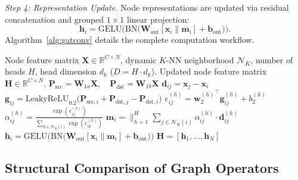\documentclass[]{interact}
\theoremstyle{plain}
\theoremstyle{definition}
\theoremstyle{remark}
\begin{document}
{\textit{Step 4: Representation Update.} Node representations are updated via residual concatenation and grouped $1 \times 1$ linear projection:
\begin{equation}
\mathbf{h}_i = \text{GELU}\!\Big(\text{BN}\!\big(\mathbf{W}_{\text{out}}[\mathbf{x}_i \parallel \mathbf{m}_i] + \mathbf{b}_{\text{out}}\big)\Big).
\label{eq:output}
\end{equation}
Algorithm~\ref{alg:gatconv} details the complete computation workflow.

\begin{algorithm}[H]
\caption{Message Passing and Attention Computation in GATConv}
\label{alg:gatconv}
\begin{algorithmic}[1]
\Require Node feature matrix $\mathbf{X} \in \mathbb{R}^{C \times N}$, dynamic $K$-NN neighborhood $\mathcal{N}_K$, number of heads $H$, head dimension $d_k$ ($D = H \cdot d_k$).
\Ensure Updated node feature matrix $\mathbf{H} \in \mathbb{R}^{C \times N}$.
\State $\mathbf{P}_{\text{src}} = \mathbf{W}_{1a} \mathbf{X}, \quad \mathbf{P}_{\text{dst}} = \mathbf{W}_{1b} \mathbf{X}$ 
    \State $\mathbf{d}_{ij} = \mathbf{x}_j - \mathbf{x}_i$ 
    \State $\mathbf{g}_{ij} = \text{LeakyReLU}_{0.2}\big(\mathbf{P}_{\text{src}, i} + \mathbf{P}_{\text{dst}, j} - \mathbf{P}_{\text{dst}, i}\big)$ 
        \State $e_{ij}^{(h)} = {\mathbf{w}_2^{(h)}}^\top \mathbf{g}_{ij}^{(h)} + b_2^{(h)}$ 
        \State $\alpha_{ij}^{(h)} = \frac{\exp(e_{ij}^{(h)})}{\sum_{k \in \mathcal{N}_K(i)} \exp(e_{ik}^{(h)})}$ 
    \EndFor
    \State $\mathbf{m}_i = \Big\|_{h=1}^H \sum_{j \in \mathcal{N}_K(i)} \alpha_{ij}^{(h)} \cdot \mathbf{d}_{ij}^{(h)}$ 
    \State $\mathbf{h}_i = \text{GELU}\Big(\text{BN}\big(\mathbf{W}_{\text{out}}[\mathbf{x}_i \parallel \mathbf{m}_i] + \mathbf{b}_{\text{out}}\big)\Big)$ 
\EndFor
\State \Return $\mathbf{H} = [\mathbf{h}_1, \dots, \mathbf{h}_N]$
\end{algorithmic}
\end{algorithm}

\subsection{Structural Comparison of Graph Operators}
\label{sec:operator_comparison}

}
\end{document}
